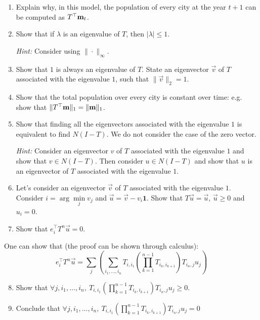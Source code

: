 \begin{enumerate}
\item Explain why, in this model, the population of every city at the year $t+1$ can be computed as $T^{\top} \mathbf{m}_{t}$.

\sol{}
\item Show that if $\lambda$ is an eigenvalue of $T$, then $|\lambda|\leq 1$.

\textit{Hint:} Consider using $\|\cdot\|_\infty$.

\sol{}
\item Show that $1$ is always an eigenvalue of $T$. State an eigenvector $\vec{v}$ of $T$ associated with the eigenvalue $1$, such that $\|\vec{v}\|_2 = 1$.

\sol{}
\item Show that the total population over every city is constant over time: e.g. show that $\| T^{\top}\mathbf{m}\|_1 = \| \mathbf{m} \|_1$.

\sol{}
\item Show that finding all the eigenvectors associated with the eigenvalue $1$ is equivalent to find $N(I-T)$. We do not consider the case of the zero vector.

\textit{Hint:} Consider an eigenvector $v$ of $T$ associated with the eigenvalue $1$ and show that $v\in N(I-T)$. Then consider $u\in N(I-T)$ and show that $u$ is an eigenvector of $T$ associated with the eigenvalue $1$.

\sol{}
\item Let's consider an eigenvector $\vec{v}$ of $T$ associated with the eigenvalue $1$. Consider $i=\arg\min\limits_j v_j$ and $\vec{u} = \vec{v}- v_i \mathbf{1}$. Show that $T\vec{u}=\vec{u}$, $\vec{u}\geq 0$ and $u_i = 0$.

\sol{}
\item Show that $e_i^\top T^n \vec{u} = 0$.

\sol{}
\end{enumerate}

One can show that (the proof can be shown through calculus):
\[e_i^\top T^n \vec{u} = \sum\limits_j \left(\sum\limits_{i_1,\dots,i_n} T_{i,i_1} \left( \prod\limits_{k=1}^{n-1} T_{i_k, i_{k+1}} \right) T_{i_n, j} u_j\right)\]

\begin{enumerate}
\setcounter{enumi}{7}
\item Show that $\forall j, {i_1,\dots,i_n}, \  T_{i,i_1} \left( \prod\limits_{k=1}^{n-1} T_{i_k, i_{k+1}} \right) T_{i_n, j} u_j \geq 0$.

\sol{}
\item Conclude that $\forall j, {i_1,\dots,i_n},\  T_{i,i_1} \left( \prod\limits_{k=1}^{n-1} T_{i_k, i_{k+1}} \right) T_{i_n, j} u_j = 0$

\sol{}
\end{enumerate}

